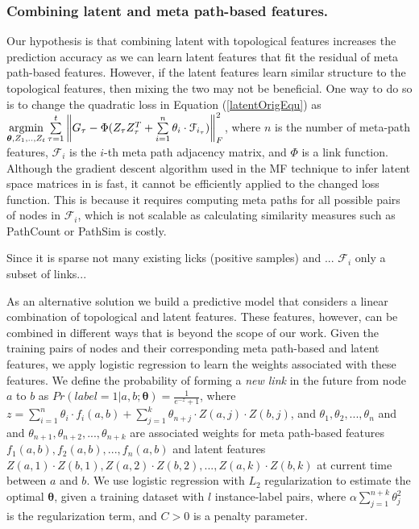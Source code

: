 \subsubsection{Combining latent and meta path-based features.}
Our hypothesis is that combining latent with topological features increases the prediction accuracy as we can learn latent features that fit the residual of meta path-based features. However, if the latent features learn similar structure to the topological features, then mixing the two may not be beneficial. One way to do so is to change the quadratic loss in Equation (\ref{latentOrigEqu}) as $\operatorname*{argmin}\limits_{\boldsymbol{\theta},Z_1, .., Z_t}\sum\limits_{\tau=1}^{t}\left \| G_\tau - \Phi(Z_{\tau}Z_{\tau}^T + \sum\limits_{i=1}^{n}\theta_i\cdot \mathcal{F}_{i_\tau}) \right \|^2_F$, where $n$ is the number of meta-path features, $\mathcal{F}_i$ is the $i$-th meta path adjacency matrix, and $\Phi$ is a link function. Although the gradient descent algorithm used in the MF technique to infer latent space matrices in \cite{Zhu2016} is fast, it cannot be efficiently applied to the changed loss function. This is because it requires computing meta paths for all possible pairs of nodes in $\mathcal{F}_i$, which is not scalable as calculating similarity measures such as PathCount or PathSim is costly. 

Since it is sparse not many existing licks (positive samples) and ... $\mathcal{F}_i$ only a subset of links...

As an alternative solution we build a predictive model that considers a linear combination of topological and latent features. These features, however, can be combined in different ways that is beyond the scope of our work. Given the training pairs of nodes and their corresponding meta path-based and latent features, we apply logistic regression to learn the weights associated with these features. We define the probability of forming a \textit{new link} in the future from node $a$ to $b$ as %
 $Pr(label=1|a, b; \boldsymbol{\theta}) = \frac{1}{e^{-z}+1}$, where $z=\sum\limits_{i=1}^{n}\theta_i\cdot f_i(a,b) + \sum\limits_{j=1}^{k} \theta_{n+j}\cdot Z(a,j)\cdot Z(b,j)$, and $\theta_1,\theta_2,..., \theta_n$ and and $\theta_{n+1},\theta_{n+2},..., \theta_{n+k}$ are associated weights for meta path-based features $f_1(a,b), f_2(a,b), ..., f_n(a,b)$ and latent features $Z(a,1)\cdot Z(b,1), Z(a,2)\cdot Z(b,2), ..., Z(a,k)\cdot Z(b,k)$ at current time between $a$ and $b$. We use logistic regression with $L_2$ regularization to estimate the optimal $\boldsymbol{\theta}$, given a training dataset with $l$ instance-label pairs, where $\alpha \sum_{j=1}^{n+k} \theta_j^2$ is the regularization term, and $C>0$ is a penalty parameter. 

